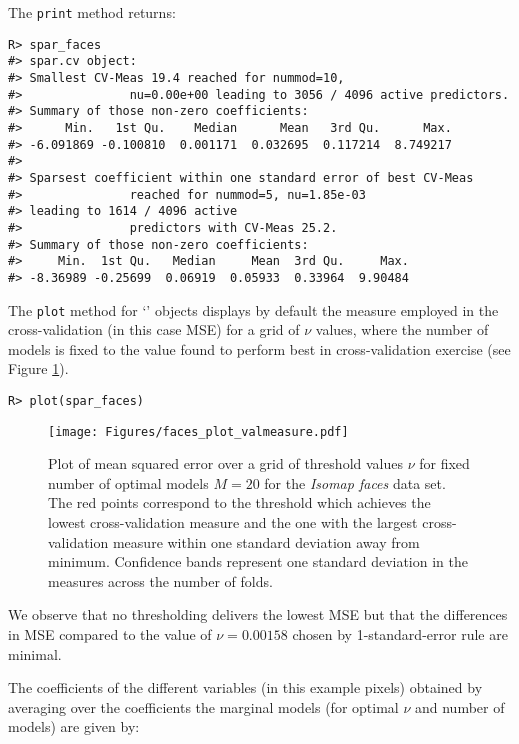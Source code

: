 \documentclass[
  article,
  nojss]{jss}
\newcommand{\class}[1]{`\code{#1}'}
\begin{document}
The \texttt{print} method returns:

\begin{verbatim}
R> spar_faces
#> spar.cv object:
#> Smallest CV-Meas 19.4 reached for nummod=10,
#>               nu=0.00e+00 leading to 3056 / 4096 active predictors.
#> Summary of those non-zero coefficients:
#>      Min.   1st Qu.    Median      Mean   3rd Qu.      Max. 
#> -6.091869 -0.100810  0.001171  0.032695  0.117214  8.749217 
#> 
#> Sparsest coefficient within one standard error of best CV-Meas
#>               reached for nummod=5, nu=1.85e-03 
#> leading to 1614 / 4096 active
#>               predictors with CV-Meas 25.2.
#> Summary of those non-zero coefficients:
#>     Min.  1st Qu.   Median     Mean  3rd Qu.     Max. 
#> -8.36989 -0.25699  0.06919  0.05933  0.33964  9.90484
\end{verbatim}

The \texttt{plot} method for \class{spar.cv} objects displays by default
the measure employed in the cross-validation (in this case MSE) for a
grid of \(\nu\) values, where the number of models is fixed to the value
found to perform best in cross-validation exercise (see Figure
\ref{fig:facesplot_valmeasure}).

\begin{verbatim}
R> plot(spar_faces)
\end{verbatim}

\begin{figure}[t!]
\centering
\texttt{[image: Figures/faces\_plot\_valmeasure.pdf]}
\caption{Plot of mean squared error over a grid of threshold values $\nu$ for fixed number of optimal models $M=20$ for the \emph{Isomap faces} data set.
The red points correspond to the threshold which achieves the lowest
cross-validation measure and the one with the largest cross-validation 
measure within one standard deviation away from minimum. Confidence bands represent one standard deviation in the measures across the number of folds. \label{fig:facesplot_valmeasure}}
\end{figure}

We observe that no thresholding delivers the lowest MSE but that the
differences in MSE compared to the value of \(\nu=0.00158\) chosen by
1-standard-error rule are minimal.

The coefficients of the different variables (in this example pixels)
obtained by averaging over the coefficients the marginal models (for
optimal \(\nu\) and number of models) are given by:
\end{document}
